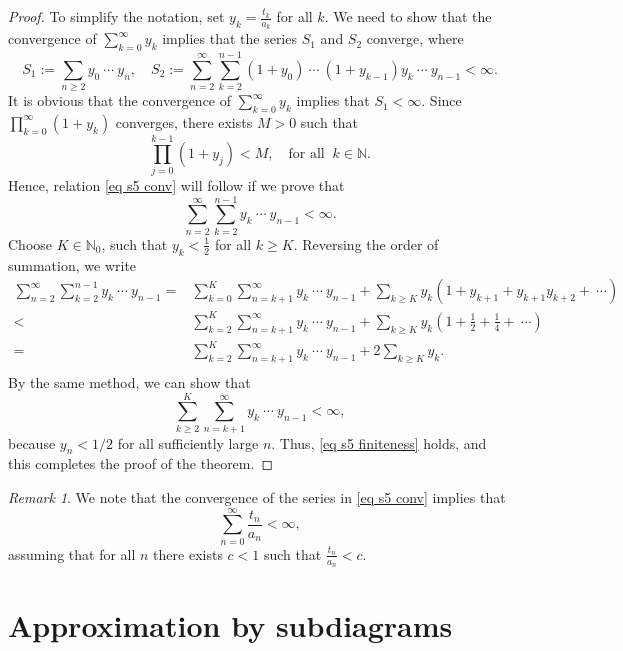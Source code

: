 \documentclass[11pt,reqno]{amsart}
\theoremstyle{definition}
\theoremstyle{remark}
\newtheorem{remark}[definition]{Remark}
\theoremstyle{plain}
\newcommand{\N}{\mathbb N}
\newcommand{\be}{\begin{equation}}
\newcommand{\ee}{\end{equation}}
\newcommand{\ba}{\begin{aligned}}
\newcommand{\ea}{\end{aligned}}
\numberwithin{equation}{section}
\begin{document}
\begin{proof}
To simplify the notation, set $y_k = \frac{t_k}{a_k}$ for all $k$.
We need to show that the  convergence of $\sum_{k=0}^{\infty} y_k$ implies that the series $S_1$ and $S_2$ converge, where 
\be\label{eq s5 conv}
S_1 := \sum_{n \geq 2} y_0\ \cdots \ y_n, \quad 
S_2 := \sum_{n=2}^{\infty} \sum_{k=2}^{n-1} (1 + y_0) \ \cdots\ (1 + y_{k-1})
y_k \ \cdots\ y_{n-1} < \infty.
\ee
It is obvious that the convergence of $\sum_{k=0}^{\infty} y_k$ implies that $S_1 < \infty$. 
Since $\prod_{k=0}^{\infty} (1 + y_k)$ converges, there exists $M >0$ such that
$$
\prod_{j=0}^{k-1} (1 + y_j) < M, \quad \mbox{for all}\;\; k \in \N.
$$
Hence, relation \eqref{eq s5 conv} will follow if we prove that 
\be\label{eq s5 finiteness}
\sum_{n=2}^{\infty} \sum_{k=2}^{n-1}y_k \ \cdots\ y_{n-1} < \infty.
\ee
Choose $K \in \N_0$, such that $y_k < \frac{1}{2}$ for all $k \geq K$.  Reversing the order of summation, we write 
$$
\ba
\sum_{n=2}^{\infty} \sum_{k=2}^{n-1}y_k \ \cdots\ y_{n-1} = & 
\sum_{k= 0}^K \sum_{n= k+1}^{\infty} y_k \ \cdots\ y_{n-1} 
+ \sum_{k\geq K} y_k (1 + y_{k+1} + y_{k+1}y_{k+2} + \ \cdots) \\
<  & \sum_{k =2}^K \sum_{n= k+1}^{\infty} y_k \ \cdots\ y_{n-1}
 + \sum_{k\geq K}  y_k \left( 1 + \frac{1}{2} + \frac{1}{4} + \ \cdots \right)\\
= & \sum_{k =2}^K \sum_{n= k+1}^{\infty} y_k \ \cdots\ y_{n-1} 
+ 2 \sum_{k\geq K}  y_k.\\
\ea 
$$
By the same method, we can show that 
$$
\sum_{k\geq 2}^K \sum_{n= k+1}^{\infty} y_k \ \cdots\ y_{n-1} < \infty, 
$$
because $y_n < 1/2$ for all sufficiently large $n$. 
Thus, \eqref{eq s5 finiteness} holds, and this completes the proof of the theorem.
\end{proof}

\begin{remark}
We note that the convergence of the series in \eqref{eq s5 conv}
implies that 
$$
\sum_{n =0}^{\infty} \frac{t_n}{a_n} < \infty, 
$$
assuming that for all $n$ there exists $c < 1$ such that $\frac{t_n}{a_n} < c$. 
\end{remark} 

\section{Approximation by subdiagrams} \label{sect Approximation}
\end{document}
